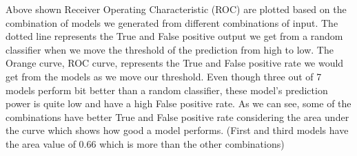 \documentclass[9pt]{article}
\begin{document}
Above shown Receiver Operating Characteristic (ROC) are plotted based on the combination of models we generated from different combinations of input. The dotted line represents the True and False positive output we get from a random classifier when we move the threshold of the prediction from high to low. The Orange curve, ROC curve, represents the True and False positive rate we would get from the models as we move our threshold. Even though three out of 7 models perform bit better than a random classifier, these model’s prediction power is quite low and have a high False positive rate. As we can see, some of the combinations have better True and False positive rate considering the area under the curve which shows how good a model performs. (First and third models have the area value of 0.66 which is more than the other combinations)
\end{document}
